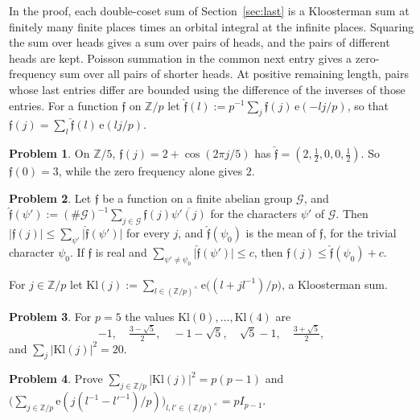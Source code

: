 \documentclass[reqno]{amsart}
\theoremstyle{definition}
\newtheorem{problem}{Problem}[section]
\theoremstyle{plain}
\theoremstyle{remark}
\newcommand{\Z}{\mathbb{Z}}
\begin{document}
In the proof, each double-coset sum of Section~\ref{sec:last} is a Kloosterman sum at finitely many finite places times an orbital integral at the infinite places.  Squaring the sum over heads gives a sum over pairs of heads, and the pairs of different heads are kept.  Poisson summation in the common next entry gives a zero-frequency sum over all pairs of shorter heads.  At positive remaining length, pairs whose last entries differ are bounded using the difference of the inverses of those entries.  For a function \(\mathfrak f\) on \(\Z/p\) let \(\hat{\mathfrak f}(l):=p^{-1}\sum_j\mathfrak f(j)\,\mathrm e(-lj/p)\), so that \(\mathfrak f(j)=\sum_l\hat{\mathfrak f}(l)\,\mathrm e(lj/p)\).

\begin{problem}\label{pr:fourier-five}
On \(\Z/5\), \(\mathfrak f(j)=2+\cos(2\pi j/5)\) has \(\hat{\mathfrak f}=(2,\tfrac12,0,0,\tfrac12)\).  So \(\mathfrak f(0)=3\), while the zero frequency alone gives \(2\).
\end{problem}

\begin{problem}\label{pr:poisson-finite}
Let \(\mathfrak f\) be a function on a finite abelian group \(\mathcal G\), and \(\hat{\mathfrak f}(\psi'):=(\#\mathcal G)^{-1}\sum_{j\in\mathcal G}\mathfrak f(j)\overline{\psi'(j)}\) for the characters \(\psi'\) of \(\mathcal G\).  Then \(\lvert\mathfrak f(j)\rvert\le\sum_{\psi'}\lvert\hat{\mathfrak f}(\psi')\rvert\) for every \(j\), and \(\hat{\mathfrak f}(\psi_0)\) is the mean of \(\mathfrak f\), for the trivial character \(\psi_0\).  If \(\mathfrak f\) is real and \(\sum_{\psi'\ne\psi_0}\lvert\hat{\mathfrak f}(\psi')\rvert\le c\), then \(\mathfrak f(j)\le\hat{\mathfrak f}(\psi_0)+c\).
\end{problem}

For \(j\in\Z/p\) let \(\mathrm{Kl}(j):=\sum_{l\in(\Z/p)^\times}\mathrm e\bigl((l+jl^{-1})/p\bigr)\), a Kloosterman sum.

\begin{problem}\label{pr:kloosterman}
For \(p=5\) the values \(\mathrm{Kl}(0),\dots,\mathrm{Kl}(4)\) are
\[
 -1,\quad \tfrac{3-\sqrt5}2,\quad -1-\sqrt5,\quad \sqrt5-1,\quad \tfrac{3+\sqrt5}2,
\]
and \(\sum_j\lvert\mathrm{Kl}(j)\rvert^2=20\).
\end{problem}

\begin{problem}\label{pr:kloosterman-sum}
Prove \(\sum_{j\in\Z/p}\lvert\mathrm{Kl}(j)\rvert^2=p(p-1)\) and \(\bigl(\sum_{j\in\Z/p}\mathrm e(j(l^{-1}-l'^{-1})/p)\bigr)_{l,l'\in(\Z/p)^\times}=pI_{p-1}\).
\end{problem}
\end{document}
